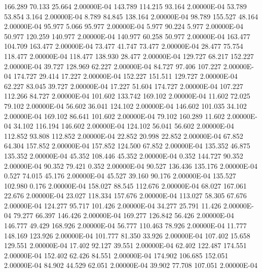    166.289    70.133    25.664  2.00000E-04
   143.789   114.215    93.164  2.00000E-04
    53.789    53.854     3.164  2.00000E-04
     8.789    84.845   138.164  2.00000E-04
    98.789   155.527    48.164  2.00000E-04
    95.977     5.066    95.977  2.00000E-04
     5.977    90.224     5.977  2.00000E-04
    50.977   120.259   140.977  2.00000E-04
   140.977    60.258    50.977  2.00000E-04
   163.477   104.709   163.477  2.00000E-04
    73.477    41.747    73.477  2.00000E-04
    28.477    75.754   118.477  2.00000E-04
   118.477   138.930    28.477  2.00000E-04
   129.727    68.217   152.227  2.00000E-04
    39.727   128.969    62.227  2.00000E-04
    84.727    97.406   107.227  2.00000E-04
   174.727    29.414    17.227  2.00000E-04
   152.227   151.511   129.727  2.00000E-04
    62.227    83.045    39.727  2.00000E-04
    17.227    51.604   174.727  2.00000E-04
   107.227   112.266    84.727  2.00000E-04
   101.602   133.742   169.102  2.00000E-04
    11.602    72.025    79.102  2.00000E-04
    56.602    36.041   124.102  2.00000E-04
   146.602   101.035    34.102  2.00000E-04
   169.102    86.641   101.602  2.00000E-04
    79.102   160.289    11.602  2.00000E-04
    34.102   116.194   146.602  2.00000E-04
   124.102    56.041    56.602  2.00000E-04
   112.852    93.808   112.852  2.00000E-04
    22.852    20.998    22.852  2.00000E-04
    67.852    64.304   157.852  2.00000E-04
   157.852   124.500    67.852  2.00000E-04
   135.352    46.875   135.352  2.00000E-04
    45.352   108.446    45.352  2.00000E-04
     0.352   144.727    90.352  2.00000E-04
    90.352    79.421     0.352  2.00000E-04
    90.527   136.436   135.176  2.00000E-04
     0.527    74.015    45.176  2.00000E-04
    45.527    39.160    90.176  2.00000E-04
   135.527   102.980     0.176  2.00000E-04
   158.027    88.545   112.676  2.00000E-04
    68.027   167.061    22.676  2.00000E-04
    23.027   118.334   157.676  2.00000E-04
   113.027    58.305    67.676  2.00000E-04
   124.277    95.717   101.426  2.00000E-04
    34.277    25.791    11.426  2.00000E-04
    79.277    66.397   146.426  2.00000E-04
   169.277   126.842    56.426  2.00000E-04
   146.777    49.429   168.926  2.00000E-04
    56.777   110.463    78.926  2.00000E-04
    11.777   148.169   123.926  2.00000E-04
   101.777    81.350    33.926  2.00000E-04
   107.402    15.658   129.551  2.00000E-04
    17.402    92.127    39.551  2.00000E-04
    62.402   122.487   174.551  2.00000E-04
   152.402    62.426    84.551  2.00000E-04
   174.902   106.685   152.051  2.00000E-04
    84.902    44.529    62.051  2.00000E-04
    39.902    77.708   107.051  2.00000E-04
